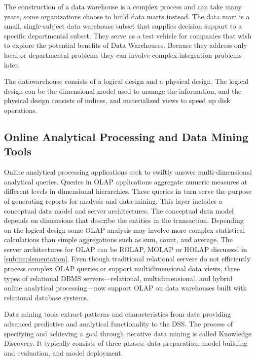 \documentclass[]{article}
\begin{document}
The construction of a data warehouse is a complex process and can take many years, some organizations choose to build data marts
instead. The data mart is a small, single-subject data warehouse subset that supplies decision support to a specific departmental
subset. They serve as a test vehicle for companies that wish to explore the potential benefits of Data Warehouses. Because they address
only local or departmental problems they can involve complex integration problems later.

The datawarehouse consists of a logical design and a physical design. The logical design can be the dimensional model used to manage the
information, and the physical design consists of indices, and materialized views to speed up disk operations.


\subsection{Online Analytical Processing and Data Mining Tools} %
\label{sub:online_analytical_procesing_and_data_mining_tools}

Online analytical processing applications seek to swiftly answer multi-dimensional analytical queries. Queries in OLAP applications
aggregate numeric measures at different levels in dimensional hierarchies. These queries in turn serve the purpose of generating reports
for analysis and data mining. This layer includes a conceptual data model and server architectures. The conceptual data model depends on
dimensions that describe the entities in the transaction. Depending on the logical design some OLAP analysis may involve more complex
statistical calculations than simple aggregations such as sum, count, and average. The server architectures for OLAP can be ROLAP, MOLAP
or HOLAP discussed in \ref{sub:implementation}. Even though traditional relational servers do not efficiently process complex OLAP
queries or support multidimensional data views, three types of relational DBMS servers—relational, multidimensional, and hybrid online
analytical processing—now support OLAP on data warehouses built with relational database systems.

Data mining tools extract patterns and characteristics from data providing advanced predictive and analytical functionality to the DSS.
The process of specifying and achieving a goal through iterative data mining is called Knowledge Discovery. It typically consists of
three phases: data preparation, model building and evaluation, and model deployment.
\end{document}
